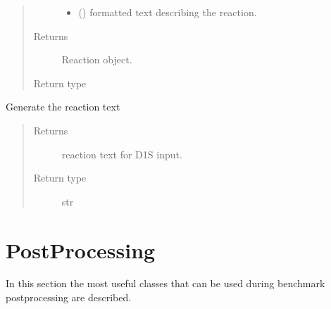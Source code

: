 \documentclass[letterpaper,10pt,english]{sphinxmanual}
\begin{document}
\begin{fulllineitems}
\begin{fulllineitems}
\begin{quote}
\begin{description}
\begin{itemize}
\item {} 
\sphinxAtStartPar
{} () \textendash{} formatted text describing the reaction.

\end{itemize}

\item[{Returns}] \leavevmode
\sphinxAtStartPar
Reaction object.

\item[{Return type}] \leavevmode
\sphinxAtStartPar
{\hyperref[\detokenize{api/inputgeneration:parsersD1S.Reaction}]{}}

\end{description}\end{quote}

\end{fulllineitems}


\begin{fulllineitems}
\label{\detokenize{api/inputgeneration:parsersD1S.Reaction.write}}
\sphinxAtStartPar
Generate the reaction text
\begin{quote}\begin{description}
\item[{Returns}] \leavevmode
\sphinxAtStartPar
{} \textendash{} reaction text for D1S input.

\item[{Return type}] \leavevmode
\sphinxAtStartPar
str

\end{description}\end{quote}

\end{fulllineitems}


\end{fulllineitems}



\chapter{Post\sphinxhyphen{}Processing}
\label{\detokenize{api/postprocessing:post-processing}}\label{\detokenize{api/postprocessing::doc}}
\sphinxAtStartPar
In this section the most useful classes that can be used during benchmark
post\sphinxhyphen{}processing are described.
\end{document}
